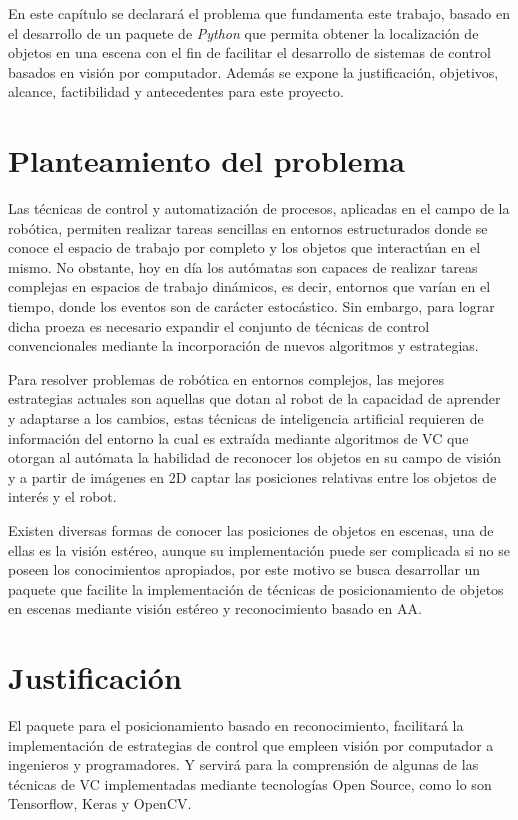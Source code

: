 En este capítulo se declarará el problema que fundamenta este trabajo, basado en el desarrollo de un paquete de \textit{Python} que permita obtener la localización de objetos en una escena con el fin de facilitar el desarrollo de sistemas de control basados en visión por computador. Además se expone la justificación, objetivos, alcance, factibilidad y antecedentes para este proyecto.

\section{Planteamiento del problema}
Las técnicas de control y automatización de procesos, aplicadas en el campo de la robótica, permiten realizar tareas sencillas en entornos estructurados donde se conoce el espacio de trabajo por completo y los objetos que interactúan en el mismo. No obstante, hoy en día los autómatas son capaces de realizar tareas complejas en espacios de trabajo dinámicos, es decir, entornos que varían en el tiempo, donde los eventos son de carácter estocástico. Sin embargo, para lograr dicha proeza es necesario expandir el conjunto de técnicas de control convencionales mediante la incorporación de nuevos algoritmos y estrategias.  

Para resolver problemas de robótica en entornos complejos, las mejores estrategias actuales son aquellas que dotan al robot de la capacidad de aprender y adaptarse a los cambios, estas técnicas de inteligencia artificial requieren de información del entorno la cual es extraída mediante algoritmos de VC que otorgan al autómata la habilidad de reconocer los objetos en su campo de visión y a partir de imágenes en 2D captar las posiciones relativas entre los objetos de interés y el robot. 

Existen diversas formas de conocer las posiciones de objetos en escenas, una de ellas es la visión estéreo, aunque su implementación puede ser complicada si no se poseen los conocimientos apropiados, por este motivo se busca desarrollar un paquete que facilite la implementación de técnicas de posicionamiento de objetos en escenas mediante visión estéreo y reconocimiento basado en AA.
\section{Justificación}
El paquete para el posicionamiento basado en reconocimiento, facilitará la implementación de estrategias de control que empleen visión por computador a ingenieros y programadores. Y servirá para la comprensión de algunas de las técnicas de VC implementadas mediante tecnologías Open Source, como lo son Tensorflow, Keras y OpenCV.

